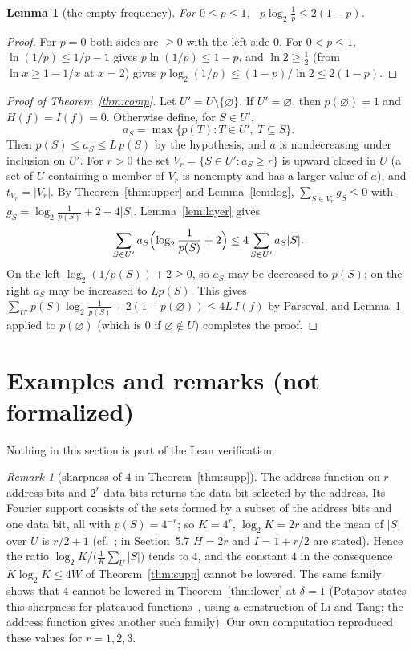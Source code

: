 \documentclass[11pt]{article}
\newtheorem{lemma}{Lemma}
\theoremstyle{definition}
\theoremstyle{remark}
\newtheorem{remark}{Remark}
\renewcommand{\lg}{\log_2}
\begin{document}
\begin{lemma}[the empty frequency]\label{lem:dc}
For $0\le p\le1$, \ $p\lg\frac1p\le2(1-p)$.
\end{lemma}

\begin{proof}
For $p=0$ both sides are $\ge0$ with the left side $0$. For $0<p\le1$,
$\ln(1/p)\le1/p-1$ gives $p\ln(1/p)\le1-p$, and $\ln2\ge\frac12$ (from
$\ln x\ge1-1/x$ at $x=2$) gives $p\lg(1/p)\le(1-p)/\ln2\le2(1-p)$.
\end{proof}

\begin{proof}[Proof of Theorem~\ref{thm:comp}]
Let $U'=U\setminus\{\varnothing\}$. If $U'=\varnothing$, then
$p(\varnothing)=1$ and $H(f)=I(f)=0$. Otherwise define, for $S\in U'$,
\[
a_S=\max\{p(T):T\in U',\ T\subseteq S\}.
\]
Then $p(S)\le a_S\le L\,p(S)$ by the hypothesis, and $a$ is nondecreasing under
inclusion on $U'$. For $r>0$ the set $V_r=\{S\in U':a_S\ge r\}$ is upward
closed in $U$ (a set of $U$ containing a member of $V_r$ is nonempty and has a
larger value of $a$), and $t_{V_r}=|V_r|$. By Theorem~\ref{thm:upper} and
Lemma~\ref{lem:log}, $\sum_{S\in V_r}g_S\le0$ with
$g_S=\lg\frac1{p(S)}+2-4|S|$. Lemma~\ref{lem:layer} gives
\[
\sum_{S\in U'}a_S\Bigl(\lg\frac1{p(S)}+2\Bigr)\le4\sum_{S\in U'}a_S|S|.
\]
On the left $\lg(1/p(S))+2\ge0$, so $a_S$ may be decreased to $p(S)$; on the
right $a_S$ may be increased to $Lp(S)$. This gives
$\sum_{U'}p(S)\lg\frac1{p(S)}+2(1-p(\varnothing))\le4L\,I(f)$ by Parseval, and
Lemma~\ref{lem:dc} applied to $p(\varnothing)$ (which is $0$ if
$\varnothing\notin U$) completes the proof.
\end{proof}

\section{Examples and remarks (not formalized)}\label{sec:examples}

Nothing in this section is part of the Lean verification.

\begin{remark}[sharpness of $4$ in Theorem~\ref{thm:supp}]\label{rem:address}
The address function on $r$ address bits and $2^r$ data bits returns the data
bit selected by the address. Its Fourier support consists of the sets formed by
a subset of the address bits and one data bit, all with $p(S)=4^{-r}$; so
$K=4^r$, $\lg K=2r$ and the mean of $|S|$ over $U$ is $r/2+1$
(cf.~\cite[Sections~5.7 and~8]{shm}; in Section~5.7 $H=2r$ and $I=1+r/2$ are stated). Hence the
ratio $\lg K\big/\bigl(\frac1K\sum_U|S|\bigr)$ tends to $4$, and the constant $4$
in the consequence $K\lg K\le4W$ of Theorem~\ref{thm:supp} cannot be lowered.
The same family shows that $4$ cannot be lowered in Theorem~\ref{thm:lower} at
$\delta=1$ (Potapov states this sharpness for plateaued
functions~\cite[Section~2]{pot}, using a construction of Li and Tang; the
address function gives another such family). Our own
computation reproduced these values for $r=1,2,3$.
\end{remark}
\end{document}
